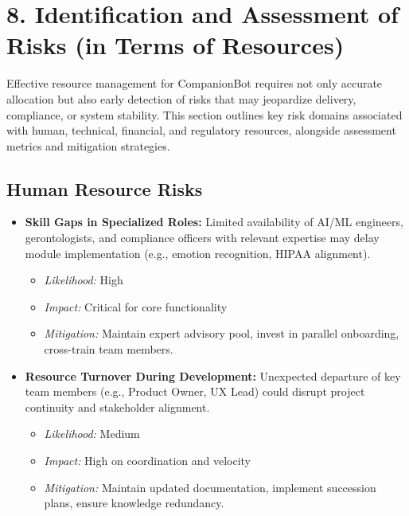 \documentclass[
  letterpaper,
  DIV=11,
  numbers=noendperiod]{scrartcl}
\providecommand{\tightlist}{%
  \setlength{\itemsep}{0pt}\setlength{\parskip}{0pt}}\usepackage{longtable,booktabs,array}
\begin{document}
\section{8. Identification and Assessment of Risks (in Terms of
Resources)}\label{identification-and-assessment-of-risks-in-terms-of-resources}

Effective resource management for CompanionBot requires not only
accurate allocation but also early detection of risks that may
jeopardize delivery, compliance, or system stability. This section
outlines key risk domains associated with human, technical, financial,
and regulatory resources, alongside assessment metrics and mitigation
strategies.

\subsection{Human Resource Risks}\label{human-resource-risks}

\begin{itemize}
\tightlist
\item
  \textbf{Skill Gaps in Specialized Roles:} Limited availability of
  AI/ML engineers, gerontologists, and compliance officers with relevant
  expertise may delay module implementation (e.g., emotion recognition,
  HIPAA alignment).

  \begin{itemize}
  \tightlist
  \item
    \emph{Likelihood:} High
  \item
    \emph{Impact:} Critical for core functionality
  \item
    \emph{Mitigation:} Maintain expert advisory pool, invest in parallel
    onboarding, cross-train team members.
  \end{itemize}
\item
  \textbf{Resource Turnover During Development:} Unexpected departure of
  key team members (e.g., Product Owner, UX Lead) could disrupt project
  continuity and stakeholder alignment.

  \begin{itemize}
  \tightlist
  \item
    \emph{Likelihood:} Medium
  \item
    \emph{Impact:} High on coordination and velocity
  \item
    \emph{Mitigation:} Maintain updated documentation, implement
    succession plans, ensure knowledge redundancy.
  \end{itemize}
\end{itemize}
\end{document}
